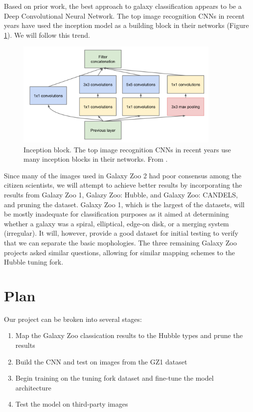 \documentclass{article}
\begin{document}
Based on prior work, the best approach to galaxy classification appears to be a Deep Convolutional Neural Network. The top image recognition CNNs in recent years have used the inception model \citep{2014arXiv1409.4842S} as a building block in their networks (Figure \ref{fig:inception}). We will follow this trend.

\begin{figure}[h]
  \centering
	\includegraphics[width=100mm]{../img/inception.png}
  \caption{Inception block. The top image recognition CNNs in recent years use many inception blocks in their networks. From \cite{2014arXiv1409.4842S}.}
  \label{fig:inception}
\end{figure}

Since many of the images used in Galaxy Zoo 2 had poor consensus among the citizen scientists, we will attempt to achieve better results by incorporating the results from Galazy Zoo 1, Galazy Zoo: Hubble, and Galaxy Zoo: CANDELS, and pruning the dataset. Galaxy Zoo 1, which is the largest of the datasets, will be mostly inadequate for classification purposes as it aimed at determining whether a galaxy was a spiral, elliptical, edge-on disk, or a merging system (irregular). It will, however, provide a good dataset for initial testing to verify that we can separate the basic mophologies. The three remaining Galaxy Zoo projects asked similar questions, allowing for similar mapping schemes to the Hubble tuning fork.



\section{Plan}
Our project can be broken into several stages:
\begin{enumerate}
\item	Map the Galaxy Zoo classication results to the Hubble types and prune the results
\item	Build the CNN and test on images from the GZ1 dataset
\item	Begin training on the tuning fork dataset and fine-tune the model architecture
\item	Test the model on third-party images
\end{enumerate}
\end{document}
